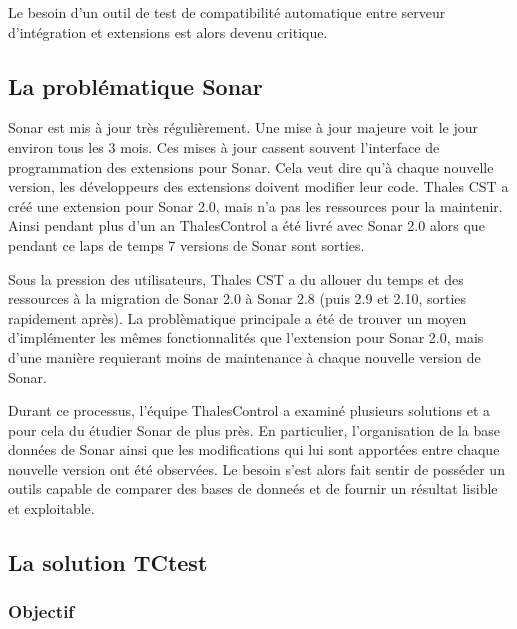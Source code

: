 Le besoin d'un outil de test de compatibilité automatique entre serveur 
d'intégration et extensions est alors devenu critique.

\subsection{La problématique Sonar}
\label{ProbSonar}

Sonar est mis à jour très régulièrement. Une mise à jour majeure voit le jour 
environ tous les 3 mois. Ces mises à jour cassent souvent l'interface de 
programmation des extensions pour Sonar. Cela veut dire qu'à chaque nouvelle 
version, les développeurs des extensions doivent modifier leur code. Thales 
CST a créé une extension pour Sonar 2.0, mais n'a pas les 
ressources pour la maintenir. Ainsi pendant plus d'un an ThalesControl a été 
livré avec Sonar 2.0 alors que pendant ce laps de temps 7 versions de Sonar sont 
sorties.

Sous la pression des utilisateurs, Thales CST a du allouer du temps et des 
ressources à la migration de Sonar 2.0 à Sonar 2.8 (puis 2.9 et 2.10, sorties 
rapidement après). La problèmatique principale a été de trouver un moyen 
d'implémenter les mêmes fonctionnalités que l'extension pour Sonar 2.0, 
mais d'une manière requierant moins de maintenance à chaque nouvelle version de 
Sonar.

Durant ce processus, l'équipe ThalesControl a examiné plusieurs solutions et a 
pour cela du étudier Sonar de plus près. En particulier, l'organisation de la 
base données de Sonar ainsi que les modifications qui lui sont apportées entre 
chaque nouvelle version ont été observées. Le besoin s'est alors fait sentir 
de posséder un outils capable de comparer des bases de donneés et de fournir 
un résultat lisible et exploitable.

\subsection{La solution TCtest}
\label{TCtest}

\subsubsection{Objectif}

